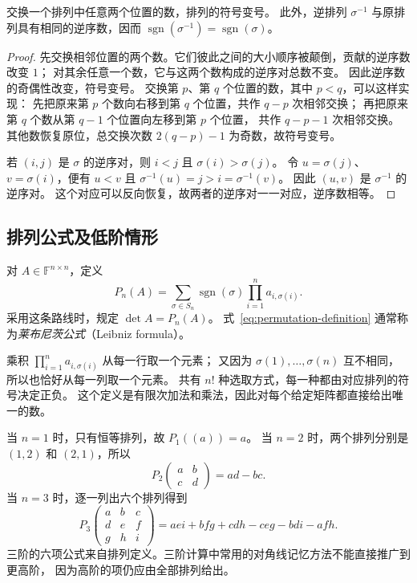 \documentclass[UTF8,12pt,a4paper,fontset=fandol]{ctexart}
\begin{document}
\begin{lemma}[排列符号的两个事实]
\label{lem:permutation-sign}
交换一个排列中任意两个位置的数，排列的符号变号。
此外，逆排列 $\sigma^{-1}$ 与原排列具有相同的逆序数，因而
$\operatorname{sgn}(\sigma^{-1})=\operatorname{sgn}(\sigma)$。
\end{lemma}

\begin{proof}
先交换相邻位置的两个数。它们彼此之间的大小顺序被颠倒，贡献的逆序数改变 $1$；
对其余任意一个数，它与这两个数构成的逆序对总数不变。
因此逆序数的奇偶性改变，符号变号。
交换第 $p$、第 $q$ 个位置的数，其中 $p<q$，可以这样实现：
先把原来第 $p$ 个数向右移到第 $q$ 个位置，共作 $q-p$ 次相邻交换；
再把原来第 $q$ 个数从第 $q-1$ 个位置向左移到第 $p$ 个位置，
共作 $q-p-1$ 次相邻交换。
其他数恢复原位，总交换次数 $2(q-p)-1$ 为奇数，故符号变号。

若 $(i,j)$ 是 $\sigma$ 的逆序对，则 $i<j$ 且 $\sigma(i)>\sigma(j)$。
令 $u=\sigma(j)$、$v=\sigma(i)$，便有
$u<v$ 且 $\sigma^{-1}(u)=j>i=\sigma^{-1}(v)$。
因此 $(u,v)$ 是 $\sigma^{-1}$ 的逆序对。
这个对应可以反向恢复，故两者的逆序对一一对应，逆序数相等。
\end{proof}

\subsection{排列公式及低阶情形}

\begin{definition}[排列公式定义]
\label{def:permutation-determinant}
对 $A\in\mathbb F^{n\times n}$，定义
\begin{equation}
  P_n(A)=\sum_{\sigma\in S_n}\operatorname{sgn}(\sigma)
  \prod_{i=1}^{n}a_{i,\sigma(i)}.
  \label{eq:permutation-definition}
\end{equation}
采用这条路线时，规定 $\det A=P_n(A)$。
式~\eqref{eq:permutation-definition} 通常称为\emph{莱布尼茨公式}（Leibniz formula）。
\end{definition}

乘积 $\prod_{i=1}^{n}a_{i,\sigma(i)}$ 从每一行取一个元素；
又因为 $\sigma(1),\ldots,\sigma(n)$ 互不相同，所以也恰好从每一列取一个元素。
共有 $n!$ 种选取方式，每一种都由对应排列的符号决定正负。
这个定义是有限次加法和乘法，因此对每个给定矩阵都直接给出唯一的数。

当 $n=1$ 时，只有恒等排列，故 $P_1((a))=a$。
当 $n=2$ 时，两个排列分别是 $(1,2)$ 和 $(2,1)$，所以
\begin{equation}
  P_2\!\begin{pmatrix}a&b\\c&d\end{pmatrix}=ad-bc.
  \label{eq:two-by-two}
\end{equation}
当 $n=3$ 时，逐一列出六个排列得到
\[
  P_3\!\begin{pmatrix}a&b&c\\d&e&f\\g&h&i\end{pmatrix}
  =aei+bfg+cdh-ceg-bdi-afh.
\]
三阶的六项公式来自排列定义。三阶计算中常用的对角线记忆方法不能直接推广到更高阶，
因为高阶的项仍应由全部排列给出。
\end{document}
